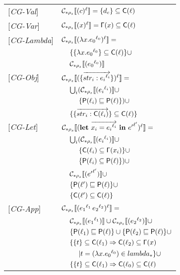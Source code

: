 \documentclass[[12pt,a4paper,twoside,openrigh]{report}
\begin{document}
\begin{tabular}{l l l l}
{[\textit{CG-Val}]} & \multicolumn{3}{l}{$ \mathcal{C}_{*\rho_s}\llbracket (c)^\ell \rrbracket = \{d_c\} \subseteq \mathsf{C}(\ell)$} \\ 
{[\textit{CG-Var}]} & \multicolumn{3}{l}{$ \mathcal{C}_{*\rho_s}\llbracket (x)^\ell \rrbracket = \mathsf{\Gamma}(x) \subseteq \mathsf{C}(\ell)$} \\ 
{[\textit{CG-Lambda}]} & \multicolumn{3}{l}{$ \mathcal{C}_{*\rho_s}\llbracket (\lambda x.{e_0}^{\ell_0})^\ell \rrbracket = $}\\
&& \multicolumn{2}{l}{$\{\{\lambda x.{e_0}^{\ell_0}\} \subseteq \mathsf{C}(\ell)\}\cup $}\\
&& \multicolumn{2}{l}{$ \mathcal{C}_{*\rho_s}\llbracket ({e_0}^{\ell_0}) \rrbracket $} \\
{[\textit{CG-Obj}]} & \multicolumn{3}{l}{$ \mathcal{C}_{*\rho_s}\llbracket (\{\overrightarrow{str_i : {e_i}^{\ell_i}}\})^\ell \rrbracket = $}\\
&& \multicolumn{2}{l}{$\bigcup_i (\mathcal{C}_{*\rho_s}\llbracket ({e_i}^{\ell_i}) \rrbracket \cup$}\\
&&& $\{\mathsf{P}(\ell_i) \sqsubseteq \mathsf{P}(\ell)\})\cup$\\ 
&& \multicolumn{2}{l}{$\{ \{\overrightarrow{str_i : \mathsf{C}(\ell_i)}\} \subseteq \mathsf{C}(\ell) \} $} \\
{[\textit{CG-Let}]} & \multicolumn{3}{l}{$\mathcal{C}_{*\rho_s}\llbracket (\mathbf{let}\ \overrightarrow{x_i = {e_i}^{\ell_i}}\ \mathbf{in}\ {e'}^{\ell'})^\ell \rrbracket = $}\\
&& \multicolumn{2}{l}{$ \bigcup_i (\mathcal{C}_{*\rho_s}\llbracket ({e_i}^{\ell_i}) \rrbracket \cup$ }\\
&&& $ \{\mathsf{C}(\ell_i) \subseteq \mathsf{\Gamma}(x_i)\} \cup$ \\
&&& $ \{ \mathsf{P}(\ell_i) \subseteq \mathsf{P}(\ell) \}) \cup $ \\
&& \multicolumn{2}{l}{$ \mathcal{C}_{*\rho_s}\llbracket ({e'}^{\ell'}) \rrbracket \cup$} \\
&& \multicolumn{2}{l}{$ \{\mathsf{P}(\ell') \sqsubseteq \mathsf{P}(\ell)\} \cup$}\\
&& \multicolumn{2}{l}{$ \{\mathsf{C}(\ell') \subseteq \mathsf{C}(\ell)\} $}\\
{[\textit{CG-App}]}&\multicolumn{3}{l}{$ \mathcal{C}_{*\rho_s}\llbracket ({e_1}^{\ell_1}\, {e_2}^{\ell_2})^\ell \rrbracket = $}\\
&& \multicolumn{2}{l}{$\mathcal{C}_{*\rho_s}\llbracket ({e_1}^{\ell_1}) \rrbracket \cup \mathcal{C}_{*\rho_s}\llbracket ({e_2}^{\ell_2}) \rrbracket \cup$} \\
&& \multicolumn{2}{l}{$\{ \mathsf{P}(\ell_1) \sqsubseteq \mathsf{P}(\ell) \} \cup \{ \mathsf{P}(\ell_2) \sqsubseteq \mathsf{P}(\ell) \}\cup$} \\
&& \multicolumn{2}{l}{$\{\{ t \} \subseteq \mathsf{C}(\ell_1) \Rightarrow \mathsf{C}(\ell_2) \subseteq \mathsf{\Gamma}(x)$}\\
&&&$| t = (\lambda x.{e_0}^{\ell_0}) \in lambda_* \}\cup$\\
&& \multicolumn{2}{l}{$\{\{ t \} \subseteq \mathsf{C}(\ell_1) \Rightarrow \mathsf{C}(\ell_0) \subseteq \mathsf{C}(\ell)$}\\

\end{tabular}
\end{document}
